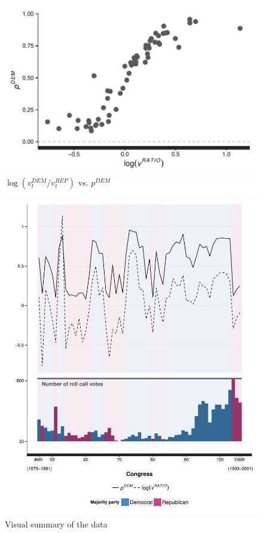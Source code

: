 \begin{figure}
\centering
	\includegraphics[scale=0.75]{sections/figs/logvratio_vs_pdem}
\caption{$\log{(v_t^{DEM} / v_t^{REP} )}$  vs. $p^{DEM}$}
\label{fig:log_vratio_vs_ptdem}
\end{figure}
%





\begin{figure}
\centering
	\includegraphics[scale=0.75]{sections/figs/vis_summary}
\caption{Visual summary of the data}
\label{fig:data_summary}
\end{figure}
%

